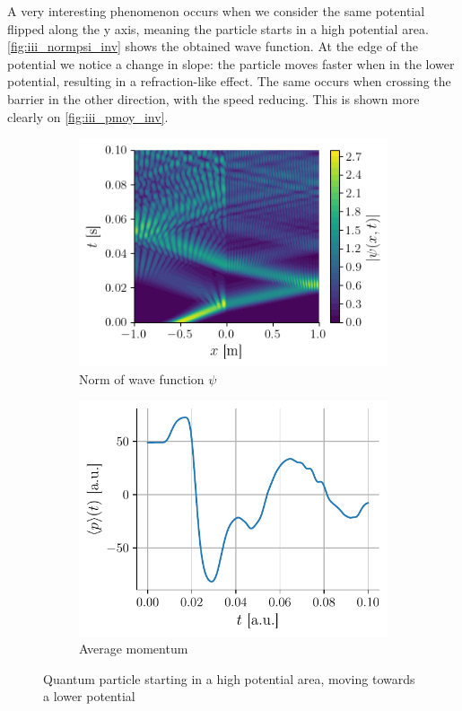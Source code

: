 A very interesting phenomenon occurs when we consider the same potential flipped along the y axis, meaning the particle starts in a high potential area. \autoref{fig:iii_normpsi_inv} shows the obtained wave function. At the edge of the potential we notice a change in slope: the particle moves faster when in the lower potential, resulting in a refraction-like effect. The same occurs when crossing the barrier in the other direction, with the speed reducing. This is shown more clearly on \autoref{fig:iii_pmoy_inv}.

\begin{figure}[h]
    \centering
    \begin{subfigure}{0.48\linewidth}
        \centering
        \includegraphics[width=\linewidth]{figures/iii_normpsi_inv.png}
        \caption{Norm of wave function $\psi$}
        \label{fig:iii_normpsi_inv}
    \end{subfigure}
    \begin{subfigure}{0.48\linewidth}
        \centering
        \includegraphics[width=\linewidth]{figures/iii_pmoy_inv.pdf}
        \caption{Average momentum}
        \label{fig:iii_pmoy_inv}
    \end{subfigure}
    \caption{Quantum particle starting in a high potential area, moving towards a lower potential}
\end{figure}